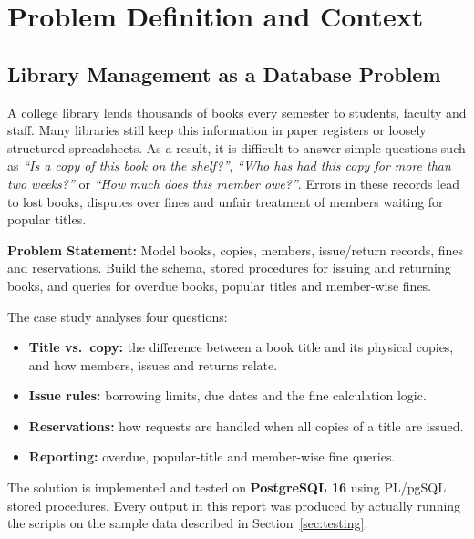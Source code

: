 \documentclass[11pt,a4paper]{report}
\begin{document}

\tableofcontents
\newpage


\section{Problem Definition and Context}

\subsection{Library Management as a Database Problem}
A college library lends thousands of books every semester to students, faculty and staff. Many libraries still keep this information in paper registers or loosely structured spreadsheets. As a result, it is difficult to answer simple questions such as \emph{``Is a copy of this book on the shelf?''}, \emph{``Who has had this copy for more than two weeks?''} or \emph{``How much does this member owe?''}. Errors in these records lead to lost books, disputes over fines and unfair treatment of members waiting for popular titles.

\textbf{Problem Statement:} Model books, copies, members, issue/return records, fines and reservations. Build the schema, stored procedures for issuing and returning books, and queries for overdue books, popular titles and member-wise fines.

The case study analyses four questions:
\begin{itemize}
    \item \textbf{Title vs.\ copy:} the difference between a book title and its physical copies, and how members, issues and returns relate.
    \item \textbf{Issue rules:} borrowing limits, due dates and the fine calculation logic.
    \item \textbf{Reservations:} how requests are handled when all copies of a title are issued.
    \item \textbf{Reporting:} overdue, popular-title and member-wise fine queries.
\end{itemize}

The solution is implemented and tested on \textbf{PostgreSQL 16} using PL/pgSQL stored procedures. Every output in this report was produced by actually running the scripts on the sample data described in Section~\ref{sec:testing}.
\end{document}
